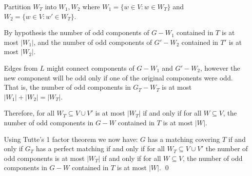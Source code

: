 \documentclass[10pt]{article}
\begin{document}
\begin{solution}
Partition \( W_T \) into \( W_1, W_2 \) where \( W_1 = \{ w\in V: w\in W_T \} \) and \( W_2 = \{ w\in V: w'\in W_T \} \).

By hypothesis the number of odd components of \( G - W_1 \) contained in \( T \) is at most \( |W_1| \), and the number of odd components of \( G' - W_2 \) contained in \( T' \) is at most \( |W_2| \).

Edges from \( L \) might connect components of \( G - W_1 \) and \( G' - W_2 \), however the new component will be odd only if one of the original components were odd. That is, the number of odd components in \( G_T - W_T \) is at most \( |W_1|+|W_2| = |W_T| \).

Therefore, for all \( W_T\subseteq V\cup  V' \) is at most \( |W_T| \) if and only if for all \( W\subseteq V \), the number of odd components in \( G - W \) contained in \( T \) is at most \( |W| \).


Using Tutte's 1 factor theorem we now have: \( G \) has a matching covering \( T \) if and only if \( G_T \) has a perfect matching if and only if 
for all \( W_T\subseteq V\cup  V' \) the number of odd components is at most \( |W_T| \) if and only if for all \( W\subseteq V \), the number of odd components in \( G - W \) contained in \( T \) is at most \( |W| \). \qed


\end{solution}
\end{document}
